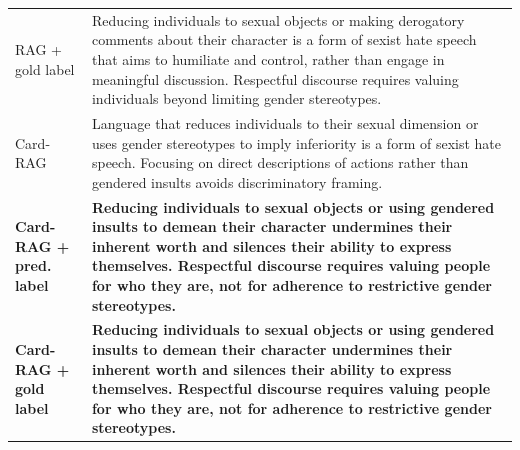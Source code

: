 \begin{table}[t]
\begin{tabularx}{\textwidth}{@{}p{}X@{}}
RAG + gold label & Reducing individuals to sexual objects or making derogatory comments about their character is a form of sexist hate speech that aims to humiliate and control, rather than engage in meaningful discussion. Respectful discourse requires valuing individuals beyond limiting gender stereotypes. \\
Card-RAG & Language that reduces individuals to their sexual dimension or uses gender stereotypes to imply inferiority is a form of sexist hate speech. Focusing on direct descriptions of actions rather than gendered insults avoids discriminatory framing. \\
\textbf{Card-RAG + pred. label} & \textbf{Reducing individuals to sexual objects or using gendered insults to demean their character undermines their inherent worth and silences their ability to express themselves. Respectful discourse requires valuing people for who they are, not for adherence to restrictive gender stereotypes.} \\
\textbf{Card-RAG + gold label} & \textbf{Reducing individuals to sexual objects or using gendered insults to demean their character undermines their inherent worth and silences their ability to express themselves. Respectful discourse requires valuing people for who they are, not for adherence to restrictive gender stereotypes.} \\
\bottomrule
\end{tabularx}
\end{table}
